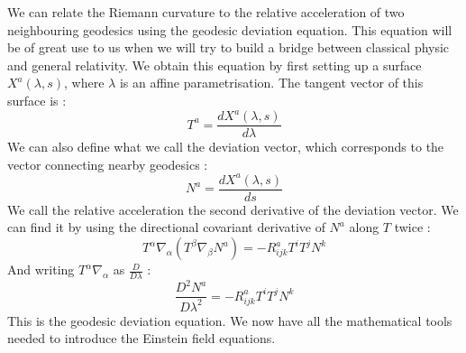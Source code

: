 \documentclass[a4paper,12pt]{article}
\theoremstyle{definition}
\begin{document}
We can relate the Riemann curvature to the relative acceleration of two neighbouring geodesics using the geodesic deviation equation.
This equation will be of great use to us when we will try to build a bridge between classical physic and general relativity.
We obtain this equation by first setting up a surface $X^a(\lambda,s)$, where $\lambda$ is an affine parametrisation.
The tangent vector of this surface is :
\begin{equation}
	T^a=\frac{dX^a(\lambda,s)}{d\lambda}
\end{equation}
We can also define what we call the deviation vector, which corresponds to the vector connecting nearby geodesics :
\begin{equation}
	N^a=\frac{dX^a(\lambda,s)}{ds}
\end{equation}
We call the relative acceleration the second derivative of the deviation vector.
We can find it by using the directional covariant derivative of $N^a$ along $T$ twice :
\begin{equation}
	T^\alpha\nabla_\alpha(T^\beta\nabla_\beta N^a)=-R^a_{ijk}T^iT^jN^k
\end{equation}
And writing $T^\alpha\nabla_\alpha$ as $\frac{D}{D\lambda}$ :
\begin{equation}\label{Dev_Equ}
	\frac{D^2N^a}{D\lambda^2}=-R^a_{ijk}T^iT^jN^k
\end{equation}
This is the geodesic deviation equation.
We now have all the mathematical tools needed to introduce the Einstein field equations.
\end{document}

